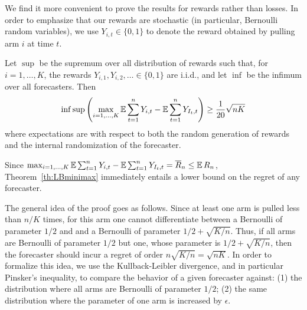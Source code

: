 We find it more convenient to prove the results for rewards rather than losses. In order to emphasize that our rewards are stochastic (in particular, Bernoulli random variables), we use $Y_{i,t}\in\{0,1\}$ to denote the reward obtained by pulling arm $i$ at time $t$.
%
\begin{theorem} \label{th:LBminimax}
Let $\sup$ be the supremum over all distribution of rewards such that, for $i=1,\dots,K$, the rewards $Y_{i,1},Y_{i,2},\ldots\in\{0,1\}$ are i.i.d., and let $\inf$ be the infimum over all forecasters. Then
\begin{equation} \label{eq:LBminimax}
\inf \sup \left(\max_{i=1,\hdots,K} \mathbb{E} \sum_{t=1}^n Y_{i,t} - \mathbb{E} \sum_{t=1}^n Y_{I_t,t} \right) \geq \frac{1}{20} \sqrt{n K}
\end{equation}
where expectations are with respect to both the random generation of rewards and the internal randomization of the forecaster.
\end{theorem}
%
Since $\max_{i=1,\hdots,K} \mathbb{E} \sum_{t=1}^n Y_{i,t} - \mathbb{E} \sum_{t=1}^n Y_{I_t,t} = \overline{R}_n \le \mathbb{E}\,R_n$, Theorem~\ref{th:LBminimax} immediately entails a lower bound on the regret of any forecaster.

The general idea of the proof goes as follows. Since at least one arm is pulled less than $n/K$ times, for this arm one cannot differentiate between a Bernoulli of parameter $1/2$ and and a Bernoulli of parameter $1/2+\sqrt{K/n}$. Thus, if all arms are Bernoulli of parameter $1/2$ but one, whose parameter is $1/2+\sqrt{K/n}$, then the forecaster should incur a regret of order $n \sqrt{K/n} = \sqrt{n K}$. In order to formalize this idea, we use the Kullback-Leibler divergence, and in particular Pinsker's inequality, to compare the behavior of a given forecaster against: (1) the distribution where all arms are Bernoulli of parameter $1/2$; (2) the same distribution where the parameter of one arm is increased by $\epsilon$. 

